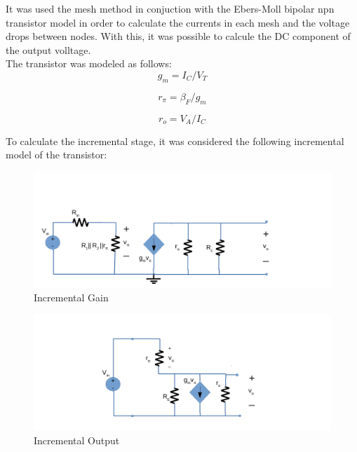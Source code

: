 It was used the mesh method in conjuction with the Ebers-Moll bipolar npn transistor model in order to calculate the currents in each mesh and the voltage drops between nodes. With this, it was possible to calcule the DC component of the output volltage.\\

The transistor was modeled as follows:\\

\begin{equation}
 g_{m} = I_{C}/V_{T}
 \label{}
\end{equation} 

\begin{equation}
 r_{\pi}= {\beta}_{F}/g_{m}
   \label{}
\end{equation} 

\begin{equation}
  r_{o}= V_{A}/I_{C}
  \label{}
\end{equation} 

To calculate the incremental stage, it was considered the following incremental model of the transistor:\\



\begin{figure} [!htb] 
  \includegraphics[width=\linewidth]{incrementalgain.pdf}
  \caption{Incremental Gain}
  \label{fig:theoplots}
  \endminipage\hfill
\end{figure}



\begin{figure} [!htb] 
  \includegraphics[width=\linewidth]{incrementaloutput.pdf}
  \caption{Incremental Output}
  \label{fig:theoplots}
  \endminipage\hfill
\end{figure}

